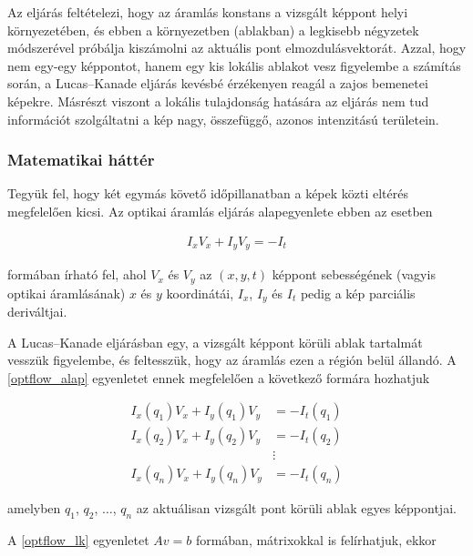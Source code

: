 Az eljárás feltételezi, hogy az áramlás konstans a vizsgált képpont helyi környezetében, és ebben a környezetben (ablakban) a legkisebb négyzetek módszerével próbálja kiszámolni az aktuális pont elmozdulásvektorát. Azzal, hogy nem egy-egy képpontot, hanem egy kis lokális ablakot vesz figyelembe a számítás során, a Lucas--Kanade eljárás kevésbé érzékenyen reagál a zajos bemenetei képekre. Másrészt viszont a lokális tulajdonság hatására az eljárás nem tud információt szolgáltatni a kép nagy, összefüggő, azonos intenzitású területein.

\subsubsection{Matematikai háttér}\label{sect:matrixok}

Tegyük fel, hogy két egymás követő időpillanatban a képek közti eltérés megfelelően kicsi. Az optikai áramlás eljárás alapegyenlete ebben az esetben

\begin{align}\label{eq:optflow_alap}
I_x V_x + I_y V_y = - I_t
\end{align}

formában írható fel, ahol $V_x$ és $V_y$ az $(x,y,t)$ képpont sebességének (vagyis optikai áramlásának) $x$ és $y$ koordinátái, $I_x$, $I_y$ és $I_t$ pedig a kép parciális deriváltjai.

A Lucas--Kanade eljárásban egy, a vizsgált képpont körüli ablak tartalmát vesszük figyelembe, és feltesszük, hogy az áramlás ezen a régión belül állandó. A \eqref{optflow_alap} egyenletet ennek megfelelően a következő formára hozhatjuk

\begin{align}\label{eq:optflow_lk}
I_x(q_1)V_x + I_y(q_1)V_y &= - I_t(q_1) \nonumber \\
I_x(q_2)V_x + I_y(q_2)V_y &= - I_t(q_2) \nonumber \\
&\vdots \nonumber \\
I_x(q_n)V_x + I_y(q_n)V_y &= - I_t(q_n)
\end{align}

amelyben $q_1$, $q_2$, $\ldots$, $q_n$ az aktuálisan vizsgált pont körüli ablak egyes képpontjai.

A \eqref{optflow_lk} egyenletet $Av = b$ formában, mátrixokkal is felírhatjuk, ekkor 

